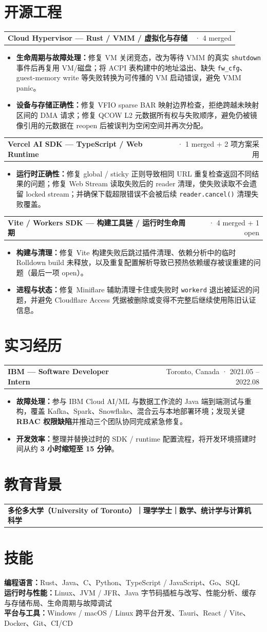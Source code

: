 \documentclass[UTF8,a4paper,11pt,fontset=none]{ctexart}
\makeatletter
\newcommand{\subroleline}[2]{%
  \vspace{-0.35pt}%
  \begin{tabularx}{\textwidth}{@{}Xr@{}}
    {\sffamily\bfseries\fontsize{10.2pt}{11.45pt}\selectfont #1} & {\sffamily\fontsize{8.65pt}{10.1pt}\selectfont #2}
  \end{tabularx}\vspace{-0.2pt}
}
\newcommand{\resumeliststart}{\begin{itemize}[leftmargin=1.42em,label=\textbullet,itemsep=0pt,parsep=0pt,topsep=-0.05pt,partopsep=0pt]}
\newcommand{\resumeitem}[1]{\item\fontsize{10.12pt}{10.68pt}\selectfont\RaggedRight #1}
\newcommand{\resumelistend}{\end{itemize}\vspace{0pt}}
\makeatother
\begin{document}
\section{开源工程}
\subroleline{Cloud Hypervisor — Rust / VMM / 虚拟化与存储}{2026.08 · 4 merged}
\resumeliststart
  \resumeitem{\textsf{\bfseries 生命周期与故障处理：}修复 VM 关闭竞态，改为等待 VMM 的真实 \texttt{shutdown} 事件后再复用 VM/磁盘；将 ACPI 表构建中的地址溢出、缺失 \texttt{fw\_cfg}、guest-memory write 等失败转换为可传播的 VM 启动错误，避免 VMM panic。}
  \resumeitem{\textsf{\bfseries 设备与存储正确性：}修复 VFIO sparse BAR 映射边界检查，拒绝跨越未映射区间的 DMA 请求；修复 QCOW L2 元数据所有权与失败顺序，避免仍被镜像引用的元数据在 reopen 后被误判为空闲空间并再次分配。}
\resumelistend

\subroleline{Vercel AI SDK — TypeScript / Web Runtime}{2026.08 · 1 merged + 2 项方案采用}
\resumeliststart
  \resumeitem{\textsf{\bfseries 运行时正确性：}修复 global / sticky 正则导致相同 URL 重复检查返回不同结果的问题；修复 Web Stream 读取失败后的 reader 清理，使失败读取不会遗留 locked stream；并确保下载超限错误不会被后续 \texttt{reader.cancel()} 清理失败覆盖。}
\resumelistend

\subroleline{Vite / Workers SDK — 构建工具链 / 运行时生命周期}{2026.08 · 4 merged + 1 open}
\resumeliststart
  \resumeitem{\textsf{\bfseries 构建与清理：}修复 Vite 构建失败后跳过插件清理、依赖分析中的临时 Rolldown build 未释放，以及重复配置解析导致已预热依赖缓存被误重建的问题（最后一项 open）。}
  \resumeitem{\textsf{\bfseries 进程与状态：}修复 Miniflare 辅助清理卡住或失败时 \texttt{workerd} 退出被延迟的问题，并避免 Cloudflare Access 凭据被删除或变得不完整后继续使用陈旧认证信息。}
\resumelistend

\section{实习经历}
\subroleline{IBM — Software Developer Intern}{Toronto, Canada · 2021.05 -- 2022.08}
\resumeliststart
  \resumeitem{\textsf{\bfseries 故障处理：}参与 IBM Cloud AI/ML 与数据工作流的 Java 端到端测试与重构，覆盖 Kafka、Spark、Snowflake、混合云与本地部署环境；发现关键 \textbf{RBAC 权限缺陷}并推动三个团队协同完成紧急修复。}
  \resumeitem{\textsf{\bfseries 开发效率：}整理并替换过时的 SDK / runtime 配置流程，将开发环境搭建时间从约 \textbf{3 小时缩短至 15 分钟}。}
\resumelistend

\section{教育背景}
\subroleline{多伦多大学（University of Toronto）｜理学学士｜数学、统计学与计算机科学}{2024.06}

\vspace{-4.2pt}\section{技能}
{\fontsize{9.72pt}{10.64pt}\selectfont
\textbf{编程语言：}Rust、Java、C、Python、TypeScript / JavaScript、Go、SQL\\[0pt]
\textbf{运行时与性能：}Linux、JVM / JFR、Java 字节码插桩与改写、性能分析、缓存与存储布局、生命周期与故障调试\\[0pt]
\textbf{平台与工具：}Windows / macOS / Linux 跨平台开发、Tauri、React / Vite、Docker、Git、CI/CD}
\end{document}
